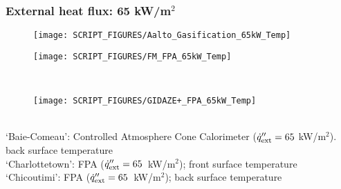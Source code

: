 \subsubsection{External heat flux: 65 kW/m$^2$}
\begin{minipage}{0.5\textwidth}
\begin{figure}[H]
{\texttt{[image: SCRIPT\_FIGURES/Aalto\_Gasification\_65kW\_Temp]}}\\
\end{figure}
\end{minipage}
\begin{minipage}{0.35\textwidth}
\begin{figure}[H]
{\texttt{[image: SCRIPT\_FIGURES/FM\_FPA\_65kW\_Temp]}}\\
\end{figure}
\end{minipage}\\
\begin{minipage}{0.5\textwidth}
\begin{figure}[H]
{\texttt{[image: SCRIPT\_FIGURES/GIDAZE+\_FPA\_65kW\_Temp]}}\\
\end{figure}
\end{minipage}\\
‘Baie-Comeau’:  Controlled Atmosphere Cone Calorimeter ($\dot{q}_{\rm ext}'' = 65$ kW/m$^2$). back surface temperature \\
‘Charlottetown’:  FPA ($\dot{q}_{\rm ext}'' = 65$~kW/m$^2$); front surface temperature \\
‘Chicoutimi’:   FPA ($\dot{q}_{\rm ext}'' = 65$~kW/m$^2$); back surface temperature  \\